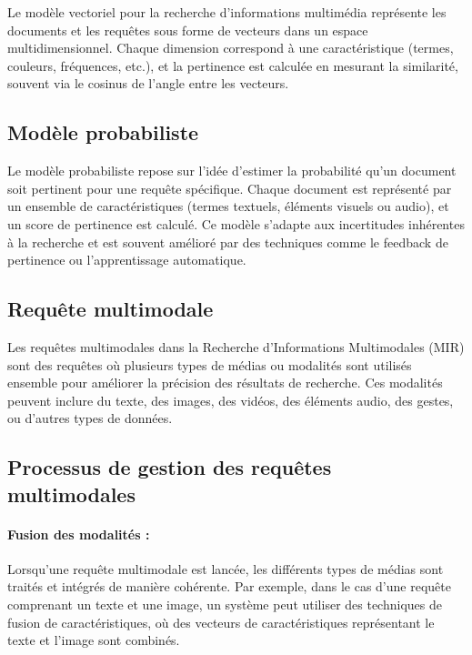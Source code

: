 \begin{section}
 Le modèle vectoriel pour la recherche d'informations multimédia représente les
 documents et les requêtes sous forme de vecteurs dans un espace
 multidimensionnel. Chaque dimension correspond à une caractéristique (termes,
 couleurs, fréquences, etc.), et la pertinence est calculée en mesurant la
 similarité, souvent via le cosinus de l'angle entre les vecteurs.

 \subsection{Modèle probabiliste}

 Le modèle probabiliste repose sur l'idée d'estimer la probabilité qu'un
 document soit pertinent pour une requête spécifique. Chaque document est
 représenté par un ensemble de caractéristiques (termes textuels, éléments
 visuels ou audio), et un score de pertinence est calculé. Ce modèle s'adapte
 aux incertitudes inhérentes à la recherche et est souvent amélioré par des
 techniques comme le feedback de pertinence ou l'apprentissage automatique.

 \section{Requête multimodale}

 Les requêtes multimodales dans la Recherche d'Informations Multimodales (MIR)
 sont des requêtes où plusieurs types de médias ou modalités sont utilisés
 ensemble pour améliorer la précision des résultats de recherche. Ces modalités
 peuvent inclure du texte, des images, des vidéos, des éléments audio, des
 gestes, ou d'autres types de données.

 \subsection{Processus de gestion des requêtes multimodales}

 \paragraph{Fusion des modalités :} Lorsqu'une requête multimodale est lancée, les différents types de médias sont
 traités et intégrés de manière cohérente. Par exemple, dans le cas d’une
 requête comprenant un texte et une image, un système peut utiliser des
 techniques de fusion de caractéristiques, où des vecteurs de caractéristiques
 représentant le texte et l'image sont combinés.


\end{section}

